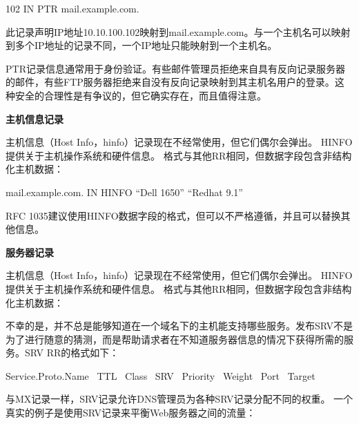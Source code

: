 ﻿\documentclass[english,runningheads,a4paper]{llncs}[2018/03/10]
\begin{document}
\par\setlength\parindent{2em}102  \qquad IN \qquad PTR \qquad mail.example.com.


\par\setlength\parindent{2em}此记录声明IP地址10.10.100.102映射到mail.example.com。与一个主机名可以映射到多个IP地址的记录不同，一个IP地址只能映射到一个主机名。

\par\setlength\parindent{2em}PTR记录信息通常用于身份验证。有些邮件管理员拒绝来自具有反向记录服务器的邮件，有些FTP服务器拒绝来自没有反向记录映射到其主机名用户的登录。这种安全的合理性是有争议的，但它确实存在，而且值得注意。

\vbox{}

\par\noindent\textbf{主机信息记录}

\par\noindent 主机信息（Host Info，hinfo）记录现在不经常使用，但它们偶尔会弹出。 HINFO提供关于主机操作系统和硬件信息。 格式与其他RR相同，但数据字段包含非结构化主机数据：

\par\setlength\parindent{2em}mail.example.com.  \quad IN \quad HINFO \quad “Dell 1650” “Redhat 9.1”

\par\setlength\parindent{2em}RFC 1035建议使用HINFO数据字段的格式，但可以不严格遵循，并且可以替换其他信息。

\vbox{}

\par\noindent\textbf{服务器记录}

\par\noindent 主机信息（Host Info，hinfo）记录现在不经常使用，但它们偶尔会弹出。 HINFO提供关于主机操作系统和硬件信息。 格式与其他RR相同，但数据字段包含非结构化主机数据：

\par\setlength\parindent{2em}不幸的是，并不总是能够知道在一个域名下的主机能支持哪些服务。发布SRV不是为了进行随意的猜测，而是帮助请求者在不知道服务器信息的情况下获得所需的服务。SRV RR的格式如下：

\par\setlength\parindent{2em}Service.Proto.Name \ TTL \ Class \ SRV \ Priority \ Weight \ Port \ Target

\par\setlength\parindent{2em}与MX记录一样，SRV记录允许DNS管理员为各种SRV记录分配不同的权重。 一个真实的例子是使用SRV记录来平衡Web服务器之间的流量：
\end{document}
